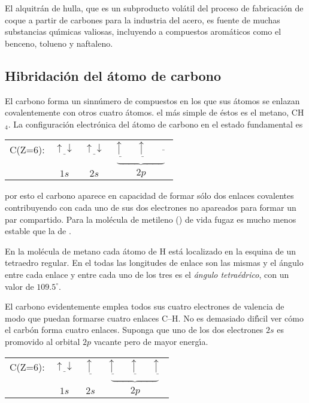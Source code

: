 El alquitr\'an de hulla, que es un subproducto vol\'atil del proceso de fabricaci\'on de
coque a partir de carbones para la industria del acero, es fuente de muchas substancias
qu\'{\i}micas valiosas, incluyendo a compuestos arom\'aticos como el benceno, tolueno y
naftaleno.

\subsection{Hibridaci\'on del \'atomo de carbono}
El carbono forma un sinn\'umero de compuestos en los que
sus \'atomos se enlazan covalentemente con otros cuatro \'atomos. el m\'as
simple de \'estos es el metano, CH$_4$. La configuraci\'on electr\'onica del
\'atomo de carbono en el estado fundamental es

\begin{center}
\begin{tabular}{rccccc}
C(Z=6):& $\underline{\uparrow \downarrow} $& $\underline{ \uparrow \downarrow}
$& $\underline{\uparrow \;} $ &$\underline{\uparrow \; }$
&$\underline{\quad}$\\[-.1in]
&&&\multicolumn{3}{c}{$\underbrace{\quad\quad\qquad\quad}$}\\
&$1s$&$2s$&\multicolumn{3}{c}{$2p$}\\
\end{tabular}
\end{center}
por esto el carbono aparece en capacidad de formar s\'olo dos enlaces covalentes
contribuyendo con cada uno de sus dos electrones no apareados para formar un par
compartido. Para la mol\'ecula de metileno () de vida fugaz es mucho menos
estable que la de .

En la mol\'ecula de metano cada \'atomo de H est\'a localizado en la esquina de
un tetraedro regular. En el  todas las longitudes de enlace son las mismas
y el \'angulo entre cada enlace  y entre cada uno de los tres es el \textit{\'angulo
tetra\'edrico}, con un valor de $109.5^\circ$. 

El carbono evidentemente emplea todos sus cuatro electrones de valencia de modo
que puedan formarse cuatro enlaces C--H. No es demasiado dif\'{\i}cil ver c\'omo
el carb\'on forma cuatro enlaces. Suponga que uno de los dos electrones $2s$ es
promovido al orbital $2p$ vacante pero de mayor energ\'{\i}a.
\begin{center}
\begin{tabular}{rccccc}
C(Z=6):& $\underline{\uparrow \downarrow} $& $\underline{ \uparrow \;}
$& $\underline{\uparrow \;} $ &$\underline{\uparrow \; }$
&$\underline{\uparrow \;}$\\[-.1in]
&&&\multicolumn{3}{c}{$\underbrace{\quad\quad\qquad\quad}$}\\
&$1s$&$2s$&\multicolumn{3}{c}{$2p$}\\
\end{tabular}
\end{center}

